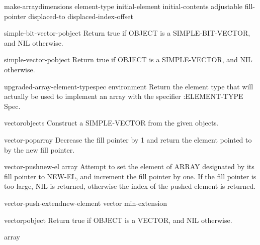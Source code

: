 \begin{function}{make-array}{dimensions \key element-type initial-element initial-contents adjustable
 fill-pointer displaced-to displaced-index-offset}{}{}
  
\end{function}

\begin{function}{simple-bit-vector-p}{object}{}{}
  Return true if OBJECT is a SIMPLE-BIT-VECTOR, and NIL otherwise.
\end{function}

\begin{function}{simple-vector-p}{object}{}{}
  Return true if OBJECT is a SIMPLE-VECTOR, and NIL otherwise.
\end{function}

\begin{function}{upgraded-array-element-type}{spec \op environment}{}{}
  Return the element type that will actually be used to implement an array
   with the specifier :ELEMENT-TYPE Spec.
\end{function}

\begin{function}{vector}{\rest objects}{}{}
  Construct a SIMPLE-VECTOR from the given objects.
\end{function}

\begin{function}{vector-pop}{array}{}{}
  Decrease the fill pointer by 1 and return the element pointed to by the
  new fill pointer.
\end{function}

\begin{function}{vector-push}{new-el array}{}{}
  Attempt to set the element of ARRAY designated by its fill pointer
   to NEW-EL, and increment the fill pointer by one. If the fill pointer is
   too large, NIL is returned, otherwise the index of the pushed element is
   returned.
\end{function}

\begin{function}{vector-push-extend}{new-element vector \op min-extension}{}{}
  
\end{function}

\begin{function}{vectorp}{object}{}{}
  Return true if OBJECT is a VECTOR, and NIL otherwise.
\end{function}

\begin{class}{array}{}{}{}
  
\end{class}

